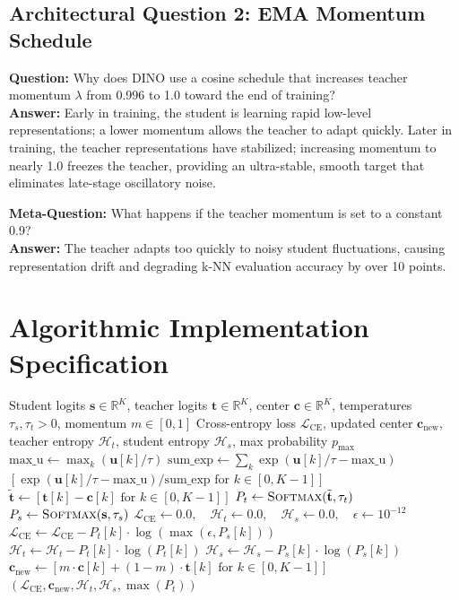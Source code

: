 \documentclass[11pt,a4paper]{article}
\theoremstyle{definition}
\begin{document}
\subsection{Architectural Question 2: EMA Momentum Schedule}
\textbf{Question:} Why does DINO use a cosine schedule that increases teacher momentum $\lambda$ from 0.996 to 1.0 toward the end of training?\\
\textbf{Answer:} Early in training, the student is learning rapid low-level representations; a lower momentum allows the teacher to adapt quickly. Later in training, the teacher representations have stabilized; increasing momentum to nearly 1.0 freezes the teacher, providing an ultra-stable, smooth target that eliminates late-stage oscillatory noise.

\textbf{Meta-Question:} What happens if the teacher momentum is set to a constant 0.9?\\
\textbf{Answer:} The teacher adapts too quickly to noisy student fluctuations, causing representation drift and degrading k-NN evaluation accuracy by over 10 points.

\section{Algorithmic Implementation Specification}

\begin{algorithm}[H]
\caption{DINO Teacher Centering, Sharpening, and Cross-Entropy Distillation}
\begin{algorithmic}[1]
\Require Student logits $\mathbf{s} \in \mathbb{R}^K$, teacher logits $\mathbf{t} \in \mathbb{R}^K$, center $\mathbf{c} \in \mathbb{R}^K$, temperatures $\tau_s, \tau_t > 0$, momentum $m \in [0, 1]$
\Ensure Cross-entropy loss $\mathcal{L}_{\text{CE}}$, updated center $\mathbf{c}_{\text{new}}$, teacher entropy $\mathcal{H}_t$, student entropy $\mathcal{H}_s$, max probability $p_{\max}$
    \State $\text{max\_u} \gets \max_k (\mathbf{u}[k] / \tau)$
    \State $\text{sum\_exp} \gets \sum_k \exp(\mathbf{u}[k] / \tau - \text{max\_u})$
    \State \Return $[\exp(\mathbf{u}[k] / \tau - \text{max\_u}) / \text{sum\_exp} \text{ for } k \in [0, K-1]]$
\EndFunction
\State $\tilde{\mathbf{t}} \gets [\mathbf{t}[k] - \mathbf{c}[k] \text{ for } k \in [0, K-1]]$
\State $P_t \gets \Call{Softmax}{\tilde{\mathbf{t}}, \tau_t}$
\State $P_s \gets \Call{Softmax}{\mathbf{s}, \tau_s}$
\State $\mathcal{L}_{\text{CE}} \gets 0.0, \quad \mathcal{H}_t \gets 0.0, \quad \mathcal{H}_s \gets 0.0, \quad \epsilon \gets 10^{-12}$
    \State $\mathcal{L}_{\text{CE}} \gets \mathcal{L}_{\text{CE}} - P_t[k] \cdot \log(\max(\epsilon, P_s[k]))$
     \State $\mathcal{H}_t \gets \mathcal{H}_t - P_t[k] \cdot \log(P_t[k])$ \EndIf
     \State $\mathcal{H}_s \gets \mathcal{H}_s - P_s[k] \cdot \log(P_s[k])$ \EndIf
\EndFor
\State $\mathbf{c}_{\text{new}} \gets [m \cdot \mathbf{c}[k] + (1 - m) \cdot \mathbf{t}[k] \text{ for } k \in [0, K-1]]$
\State \Return $(\mathcal{L}_{\text{CE}}, \mathbf{c}_{\text{new}}, \mathcal{H}_t, \mathcal{H}_s, \max(P_t))$
\end{algorithmic}
\end{algorithm}
\end{document}
